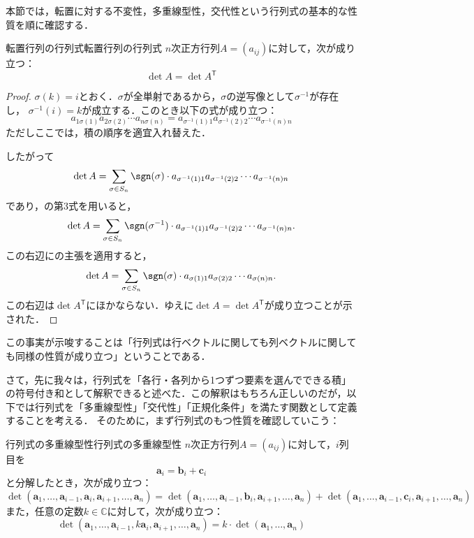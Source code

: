 本節では，転置に対する不変性，多重線型性，交代性という行列式の基本的な性質を順に確認する．


\begin{prop}{転置行列の行列式}{転置行列の行列式}
  $n$次正方行列$A = (a_{ij})$に対して，次が成り立つ：
  \[
  \det A = \det A^\mathsf{T} 
  \]
\end{prop}

\begin{leftbar}
\begin{proof}
 $\sigma (k) = i$とおく．$\sigma$が全単射であるから，$\sigma$の逆写像として$\sigma ^{-1}$が存在し，
 $\sigma ^{-1} (i)=k$が成立する．このとき以下の式が成り立つ：
 \[
 a_{1\sigma(1)} a_{2\sigma(2)} \dotsm a_{n\sigma(n)} =  a_{\sigma^{-1}(1)1} a_{\sigma^{-1}(2)2} \dotsm a_{\sigma^{-1}(n)n}
 \]
 ただしここでは，積の順序を適宜入れ替えた．

 したがって
 \[
  \det A = \sum_{\sigma \in S_n} \sgn(\sigma) \cdot a_{\sigma^{-1}(1)1} a_{\sigma^{-1}(2)2} \dotsm a_{\sigma^{-1}(n)n}
\]
であり，の第3式を用いると，
\[
\det A = \sum_{\sigma \in S_n} \sgn(\sigma^{-1}) \cdot a_{\sigma^{-1}(1)1} a_{\sigma^{-1}(2)2} \dotsm a_{\sigma^{-1}(n)n}.
\]
この右辺にの主張を適用すると，
\[
\det A = \sum_{\sigma \in S_n} \sgn (\sigma ) \cdot a_{\sigma(1)1} a_{\sigma(2)2} \dotsm a_{\sigma(n)n}.
\]
この右辺は$\det A^\mathsf{T}$にほかならない．ゆえに$\det A = \det A^\mathsf{T}$が成り立つことが示された．
\end{proof}
\end{leftbar}

この事実が示唆することは「行列式は行ベクトルに関しても列ベクトルに関しても同様の性質が成り立つ」ということである．



さて，先に我々は，行列式を「各行・各列から1つずつ要素を選んでできる積」の符号付き和として解釈できると述べた．この解釈はもちろん正しいのだが，以下では行列式を「多重線型性」「交代性」「正規化条件」を満たす関数として定義することを考える．
そのために，まず行列式のもつ性質を確認していこう：

\begin{prop}{行列式の多重線型性}{行列式の多重線型性}
  $n$次正方行列$A = (a_{ij})$に対して，$i$列目を
  \[
  \bm{a}_i = \bm{b}_i + \bm{c}_i
  \]
  と分解したとき，次が成り立つ：
  \[
  \det(\bm{a}_1, \dots, \bm{a}_{i-1}, \bm{a}_i, \bm{a}_{i+1}, \dots, \bm{a}_n) 
  = \det(\bm{a}_1, \dots, \bm{a}_{i-1}, \bm{b}_i, \bm{a}_{i+1}, \dots, \bm{a}_n) 
  + \det(\bm{a}_1, \dots, \bm{a}_{i-1}, \bm{c}_i, \bm{a}_{i+1}, \dots, \bm{a}_n)
  \]
  また，任意の定数$k \in \mathbb{C}$に対して，次が成り立つ：
  \[
  \det(\bm{a}_1, \dots, \bm{a}_{i-1}, k \bm{a}_i, \bm{a}_{i+1}, \dots, \bm{a}_n) 
  = k \cdot \det(\bm{a}_1, \dots, \bm{a}_n)
  \]
\end{prop}

